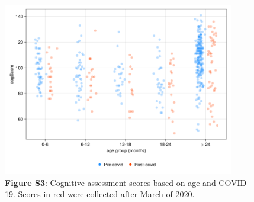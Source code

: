 \documentclass{article}
\begin{document}
\begin{figure}[h]
    \centering
    \includegraphics[width=0.9\textwidth]{assets/Supp_Figure3.png}
    \captionsetup{labelformat=empty}
    \caption{
        \textbf{Figure S3}: Cognitive assessment scores based on age
        and COVID-19. Scores in red were collected after March of 2020.
    }
\end{figure}
\end{document}
